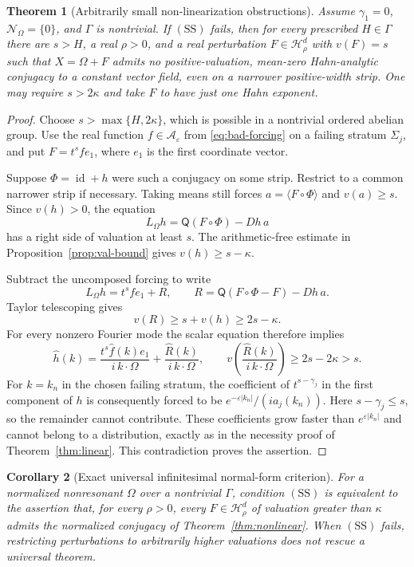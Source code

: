 \documentclass[11pt,letterpaper]{article}
\newtheorem{theorem}{Theorem}[section]
\newtheorem{corollary}[theorem]{Corollary}
\theoremstyle{definition}
\theoremstyle{remark}
\newcommand{\A}{\mathcal A}
\newcommand{\HH}{\mathcal H}
\newcommand{\id}{\operatorname{id}}
\newcommand{\mean}[1]{\langle #1\rangle}
\newcommand{\Lom}{L_{\Omega}}
\newcommand{\res}{\mathcal N_{\Omega}}
\newcommand{\SDcond}{\mathrm{SS}}
\newcommand{\eps}{\varepsilon}
\numberwithin{equation}{section}
\begin{document}
\begin{theorem}[Arbitrarily small non-linearization obstructions]
\label{thm:nonlinear-necessity}
Assume $\gamma_1=0$, $\res=\{0\}$, and $\Gamma$ is nontrivial.  If
$(\SDcond)$ fails, then for every prescribed $H\in\Gamma$ there are $s>H$,
a real $\rho>0$, and a real perturbation $F\in\HH_\rho^d$ with $v(F)=s$
such that $X=\Omega+F$ admits no positive-valuation, mean-zero
Hahn-analytic conjugacy to a constant vector field, even on a narrower
positive-width strip.  One may require $s>2\kappa$ and take $F$ to have
just one Hahn exponent.
\end{theorem}
\begin{proof}
Choose $s>\max\{H,2\kappa\}$, which is possible in a nontrivial ordered
abelian group.  Use the real function $f\in\A_\eps$ from
\eqref{eq:bad-forcing} on a failing stratum $\Sigma_j$, and put
$F=t^s f e_1$, where $e_1$ is the first coordinate vector.

Suppose $\Phi=\id+h$ were such a conjugacy on some strip.  Restrict to a
common narrower strip if necessary.  Taking means still forces
$a=\mean{F\circ\Phi}$ and $v(a)\ge s$.  Since $v(h)>0$, the equation
\[
 \Lom h=\mathsf Q(F\circ\Phi)-Dh\,a
\]
has a right side of valuation at least $s$.  The arithmetic-free estimate
in Proposition~\ref{prop:val-bound} gives $v(h)\ge s-\kappa$.

Subtract the uncomposed forcing to write
\[
 \Lom h=t^s f e_1+R,
 \qquad
 R=\mathsf Q(F\circ\Phi-F)-Dh\,a.
\]
Taylor telescoping gives
\[
 v(R)\ge s+v(h)\ge2s-\kappa.
\]
For every nonzero Fourier mode the scalar equation therefore implies
\[
 \widehat h(k)=\frac{t^s\widehat f(k)e_1}{i\,k\cdot\Omega}
               +\frac{\widehat R(k)}{i\,k\cdot\Omega},
 \qquad
 v\left(\frac{\widehat R(k)}{i\,k\cdot\Omega}\right)
       \ge2s-2\kappa>s.
\]
For $k=k_n$ in the chosen failing stratum, the coefficient of
$t^{s-\gamma_j}$ in the first component of $h$ is consequently forced to
be $e^{-\eps|k_n|}/(i a_j(k_n))$.  Here $s-\gamma_j\le s$, so the
remainder cannot contribute.  These coefficients grow faster than
$e^{\eps|k_n|}$ and cannot belong to a distribution, exactly as in the
necessity proof of Theorem~\ref{thm:linear}.  This contradiction proves the
assertion.
\end{proof}

\begin{corollary}[Exact universal infinitesimal normal-form criterion]
\label{cor:nonlinear-equivalence}
For a normalized nonresonant $\Omega$ over a nontrivial $\Gamma$, condition
$(\SDcond)$ is equivalent to the assertion that, for every $\rho>0$, every
$F\in\HH_\rho^d$ of valuation greater than $\kappa$ admits the normalized
conjugacy of Theorem~\ref{thm:nonlinear}.  When $(\SDcond)$ fails, restricting
perturbations to arbitrarily higher valuations does not rescue a universal
theorem.
\end{corollary}
\end{document}
